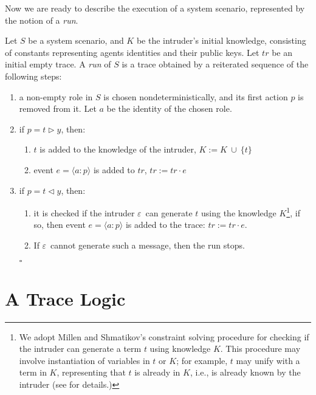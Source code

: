 \documentclass{entcs} \usepackage{entcsmacro}
\newcommand{\HB}{\hfill{$\square$}}
\newcommand{\U}{\ensuremath{\:\cup\:}}
\newcommand{\INT}{\ensuremath{\varepsilon}}
\begin{document}
Now we are ready to describe the execution of a system scenario, represented
by the notion of a \emph{run}.  

\begin{definition}
\label{procedure}
Let $S$ be a system scenario, and $K$ be the intruder's initial
knowledge, consisting of constants representing agents identities and
their public keys.  Let $tr$ be an initial empty trace.  A \emph{run} of $S$
is a trace obtained by a reiterated sequence of the following steps:
\begin{enumerate}
\item a non-empty role in $S$ is chosen nondeterministically, and   
  its first action $p$ is removed from it. Let $a$ be the identity of 
the chosen role.
\item if $p = t \triangleright y$, then:
 \begin{enumerate}
  \item $t$ is added to the knowledge of the intruder,
  $K := K \U \{t\}$
  \item event $e = \langle a : p \rangle$ is added to $tr$, $tr := tr 
\cdot e$
\end{enumerate}

\item if $p =  t \triangleleft y $, then:
\begin{enumerate}
\item it is checked if the intruder \INT\ can generate $t$ using the
knowledge $K$\footnote{We adopt Millen and Shmatikov's constraint solving procedure
\cite{MS01} for checking if the intruder can generate a term $t$ using
knowledge $K$. This procedure may involve instantiation of variables
in $t$ or $K$; for example, $t$ may unify with a term in $K$,
representing that $t$ is already in $K$, i.e., is already known by the
intruder (see \cite{MS01} for details.)}, if so, then event $e = \langle a : p
\rangle$ is added to the trace: $tr := tr \cdot e $.

\item If \INT\ cannot generate such a message, then the run stops.
\end{enumerate}\HB
\end{enumerate}
\end{definition}



\section{A Trace Logic}
\label{sec:tracemodel}
\end{document}

